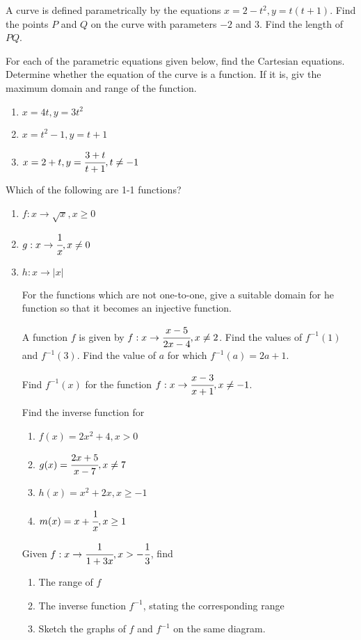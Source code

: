 \documentclass[letterpaper]{article}
\begin{document}
\begin{enumerate}
A curve is defined parametrically by the equations $x = 2 - t^2, y = t(t+1)$. Find the points $P$ and $Q$ on the curve with parameters $-2$ and $3$. Find the length of $PQ$.

For each of the parametric equations given below, find the Cartesian equations. Determine whether the equation of the curve is a function. If it is, giv the maximum domain and range of the function.

\begin{enumerate}
\item $x = 4t, y = 3t^2$
\item $x = t^2 - 1, y = t+1$
\item $x = 2+t, y = \cfrac{3+t}{t+1}, t \ne -1$
\end{enumerate}

Which of the following are 1-1 functions?

\begin{enumerate}
\item $f: x \to \sqrt{x}, x \ge 0$
\item $g: x \to \cfrac{1}{x}, x \ne 0$
\item $h: x \to |x|$

For the functions which are not one-to-one, give a suitable domain for he function so that it becomes an injective function.

A function $f$ is given by $f: x \to \cfrac{x - 5}{2x - 4}, x \ne 2$. Find the values of $f^{-1}(1)$ and $f^{-1}(3)$. Find the value of $a$ for which $f^{-1}(a) = 2a + 1$.

Find $f^{-1}(x)$ for the function $f: x \to \cfrac{x-3}{x+1}, x \ne -1$.

Find the inverse function for

\begin{enumerate}
\item $f(x) = 2x^2 + 4, x > 0$
\item $g(x) = \cfrac{2x + 5}{x - 7}, x \ne 7$
\item $h(x) = x^2 + 2x, x \ge -1$
\item $m(x) = x + \cfrac{1}{x}, x \ge 1$
\end{enumerate}

Given $f: x \to \cfrac{1}{1 + 3x}, x > -\cfrac{1}{3}$, find

\begin{enumerate}
\item The range of $f$
\item The inverse function $f^{-1}$, stating the corresponding range
\item Sketch the graphs of $f$ and $f^{-1}$ on the same diagram.
\end{enumerate}


\end{enumerate}
\end{enumerate}
\end{document}
